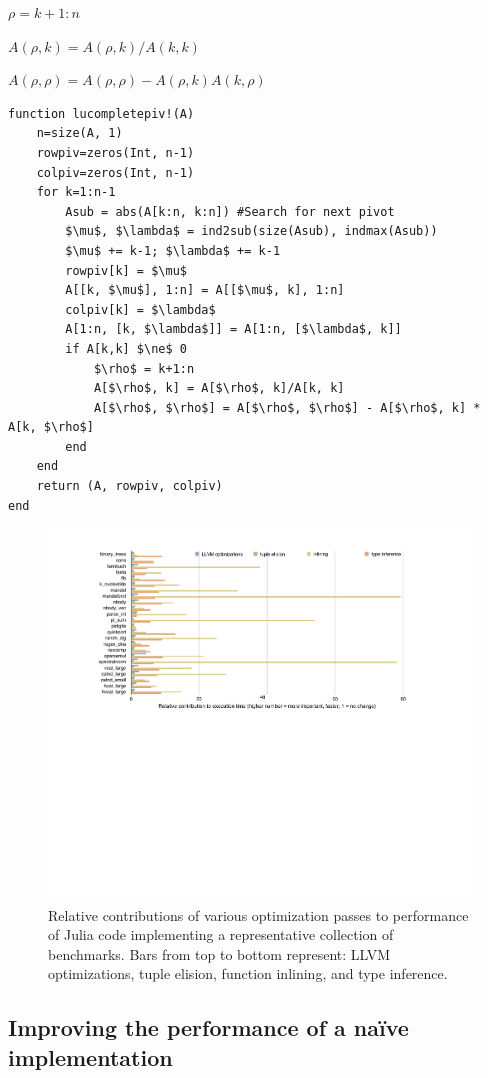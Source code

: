 \begin{algorithm}
\begin{algorithmic}
        $\rho = k+1:n$

        $A(\rho, k) = A(\rho, k)/A(k, k)$

        $A(\rho, \rho) = A(\rho, \rho) - A(\rho, k) A(k, \rho)$
    \EndIf
\EndFor
\end{algorithmic}

\hrulefill

\begin{lstlisting}
function lucompletepiv!(A)
	n=size(A, 1)
	rowpiv=zeros(Int, n-1)
	colpiv=zeros(Int, n-1)
	for k=1:n-1
		Asub = abs(A[k:n, k:n]) #Search for next pivot
		$\mu$, $\lambda$ = ind2sub(size(Asub), indmax(Asub))
		$\mu$ += k-1; $\lambda$ += k-1
		rowpiv[k] = $\mu$
		A[[k, $\mu$], 1:n] = A[[$\mu$, k], 1:n]
		colpiv[k] = $\lambda$
		A[1:n, [k, $\lambda$]] = A[1:n, [$\lambda$, k]]
		if A[k,k] $\ne$ 0
			$\rho$ = k+1:n
			A[$\rho$, k] = A[$\rho$, k]/A[k, k]
			A[$\rho$, $\rho$] = A[$\rho$, $\rho$] - A[$\rho$, k] * A[k, $\rho$]
		end
	end
	return (A, rowpiv, colpiv)
end
\end{lstlisting}

\end{algorithm}


\begin{figure}
	\includegraphics[width=\textwidth]{fig-timings}
	\caption{Relative contributions of various optimization passes to
	performance of Julia code implementing a representative collection
	of benchmarks. Bars from top to bottom represent: LLVM
	optimizations, tuple elision, function inlining, and type inference.}
	\label{fig:timings}
\end{figure}



\subsection{Improving the performance of a na\"ive implementation}


